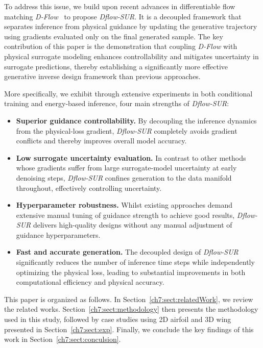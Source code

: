 To address this issue, we build upon recent advances in differentiable flow matching \textit{D-Flow}~\cite{ai.BenHamu2024} to propose \textit{Dflow-SUR}. It is a decoupled framework that separates inference from physical guidance by updating the generative trajectory using gradients evaluated only on the final generated sample. 
The key contribution of this paper is the demonstration that coupling \textit{D-Flow} with physical surrogate modeling enhances controllability and mitigates uncertainty in surrogate predictions, thereby establishing a significantly more effective generative inverse design framework than previous approaches. 

More specifically, we exhibit through extensive experiments in both conditional training and energy‐based inference, four main strengths of \textit{Dflow-SUR}:
%
\begin{itemize}
    \item \textbf{Superior guidance controllability.} By decoupling the inference dynamics from the physical‐loss gradient, \textit{Dflow-SUR} completely avoids gradient conflicts and thereby improves overall model accuracy.
    \item \textbf{Low surrogate uncertainty evaluation.} In contrast to other methods whose gradients suffer from large surrogate‐model uncertainty at early denoising steps, \textit{Dflow-SUR} confines generation to the data manifold throughout, effectively controlling uncertainty.
    \item \textbf{Hyperparameter robustness.} Whilst existing approaches demand extensive manual tuning of guidance strength to achieve good results, \textit{Dflow-SUR} delivers high-quality designs without any manual adjustment of guidance hyperparameters.
    \item \textbf{Fast and accurate generation.} The decoupled design of \textit{Dflow-SUR} significantly reduces the number of inference time steps while independently optimizing the physical loss, leading to substantial improvements in both computational efficiency and physical accuracy.
\end{itemize}

This paper is organized as follows. In Section~\ref{ch7:sect:relatedWork}, we review the related works. Section~\ref{ch7:sect:methodology} then presents the methodology used in this study, followed by case studies using 2D airfoil and 3D wing presented in Section~\ref{ch7:sect:exp}. Finally,  we conclude the key findings of this work in Section~\ref{ch7:sect:conculsion}.


